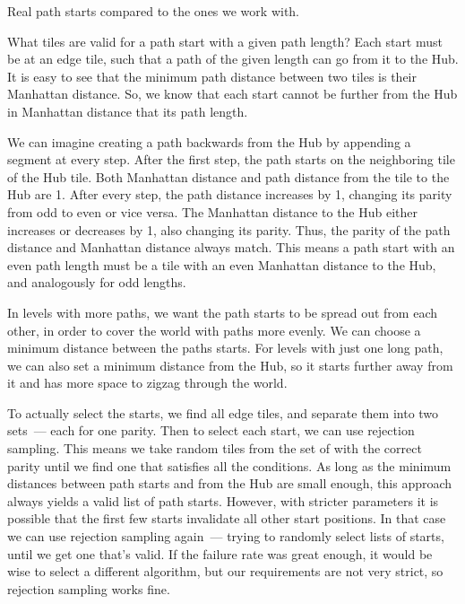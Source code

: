 \begin{center}
\begin{minipage}{.5\textwidth}
    \end{minipage}
    \caption{Real path starts compared to the ones we work with.}
    \label{fig:real-path-starts}
\end{center}

What tiles are valid for a path start with a given path length?
Each start must be at an edge tile, such that a path of the given length can go from it to the Hub.
It is easy to see that the minimum path distance between two tiles is their Manhattan distance.
So, we know that each start cannot be further from the Hub in Manhattan distance that its path length.

We can imagine creating a path backwards from the Hub by appending a segment at every step.
After the first step, the path starts on the neighboring tile of the Hub tile.
Both Manhattan distance and path distance from the tile to the Hub are 1.
After every step, the path distance increases by 1, changing its parity from odd to even or vice versa.
The Manhattan distance to the Hub either increases or decreases by 1, also changing its parity.
Thus, the parity of the path distance and Manhattan distance always match.
This means a path start with an even path length must be a tile with an even Manhattan distance to the Hub, and analogously for odd lengths.

In levels with more paths, we want the path starts to be spread out from each other, in order to cover the world with paths more evenly.
We can choose a minimum distance between the paths starts.
For levels with just one long path, we can also set a minimum distance from the Hub, so it starts further away from it and has more space to zigzag through the world.

To actually select the starts, we find all edge tiles, and separate them into two sets~--- each for one parity.
Then to select each start, we can use rejection sampling.
This means we take random tiles from the set of with the correct parity until we find one that satisfies all the conditions.
As long as the minimum distances between path starts and from the Hub are small enough, this approach always yields a valid list of path starts.
However, with stricter parameters it is possible that the first few starts invalidate all other start positions.
In that case we can use rejection sampling again~--- trying to randomly select lists of starts, until we get one that's valid.
If the failure rate was great enough, it would be wise to select a different algorithm, but our requirements are not very strict, so rejection sampling works fine.

